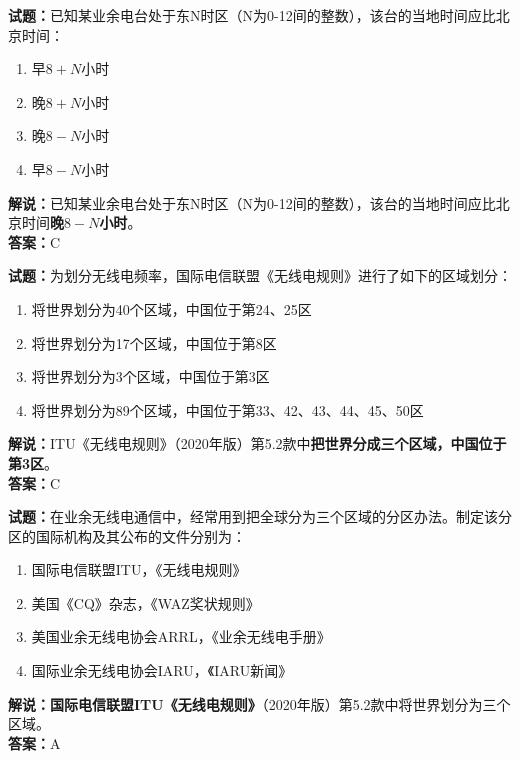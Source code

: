 \documentclass{ctexbook}
\begin{document}
\vspace{1em}

\textbf{试题：}已知某业余电台处于东N时区（N为0-12间的整数），该台的当地时间应比北京时间：
\begin{enumerate}[leftmargin=3em]
  \item 早\(8+N\)小时
  \item 晚\(8+N\)小时
  \item 晚\(8-N\)小时
  \item 早\(8-N\)小时
\end{enumerate}
\noindent\textbf{解说：}已知某业余电台处于东N时区（N为0-12间的整数），该台的当地时间应比北京时间\textbf{晚\(8-N\)小时}。\\\noindent\textbf{答案：}C

\vspace{1em}

\textbf{试题：}为划分无线电频率，国际电信联盟《无线电规则》进行了如下的区域划分：
\begin{enumerate}[leftmargin=3em]
  \item 将世界划分为40个区域，中国位于第24、25区
  \item 将世界划分为17个区域，中国位于第8区
  \item 将世界划分为3个区域，中国位于第3区
  \item 将世界划分为89个区域，中国位于第33、42、43、44、45、50区
\end{enumerate}
\noindent\textbf{解说：}ITU《无线电规则》（2020年版）第5.2款中\textbf{把世界分成三个区域，中国位于第3区}。\\\noindent\textbf{答案：}C

\vspace{1em}

\textbf{试题：}在业余无线电通信中，经常用到把全球分为三个区域的分区办法。制定该分区的国际机构及其公布的文件分别为：
\begin{enumerate}[leftmargin=3em]
  \item 国际电信联盟ITU，《无线电规则》
  \item 美国《CQ》杂志，《WAZ奖状规则》
  \item 美国业余无线电协会ARRL，《业余无线电手册》
  \item 国际业余无线电协会IARU，《IARU新闻》
\end{enumerate}
\noindent\textbf{解说：}\textbf{国际电信联盟ITU《无线电规则》}（2020年版）第5.2款中将世界划分为三个区域。\\\noindent\textbf{答案：}A

\vspace{1em}
\end{document}
